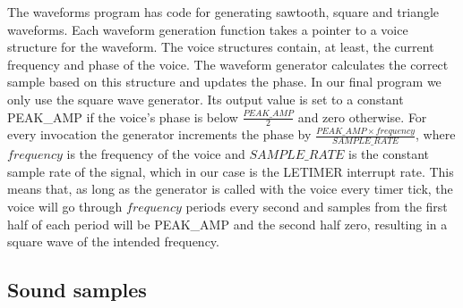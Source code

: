 The waveforms program has code for generating sawtooth, square and triangle
waveforms. Each waveform generation function takes a pointer to a voice
structure for the waveform. The voice structures contain, at least, the current
frequency and phase of the voice. The waveform generator calculates the correct
sample based on this structure and updates the phase. In our final program we
only use the square wave generator. Its output value is set to a constant
PEAK\_AMP if the voice's phase is below \(\frac{PEAK\_AMP}{2}\) and zero
otherwise. For every invocation the generator increments the phase by
\(\frac{PEAK\_AMP \times frequency}{SAMPLE\_RATE}\), where \(frequency\) is the
frequency of the voice and \(SAMPLE\_RATE\) is the constant sample rate of the
signal, which in our case is the LETIMER interrupt rate. This means that, as
long as the generator is called with the voice every timer tick, the voice will
go through \(frequency\) periods every second and samples from the first half of
each period will be PEAK\_AMP and the second half zero, resulting in a square
wave of the intended frequency.

\subsection{Sound samples}

